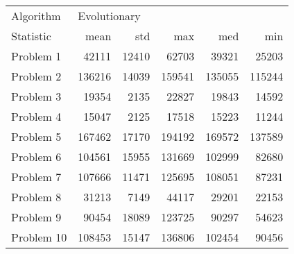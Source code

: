 \begin{tabular}{lrrrrr}
\toprule
Algorithm & \multicolumn{5}{l}{Evolutionary} \\
Statistic &         mean &    std &     max &     med &     min \\
\midrule
Problem 1  &        42111 &  12410 &   62703 &   39321 &   25203 \\
Problem 2  &       136216 &  14039 &  159541 &  135055 &  115244 \\
Problem 3  &        19354 &   2135 &   22827 &   19843 &   14592 \\
Problem 4  &        15047 &   2125 &   17518 &   15223 &   11244 \\
Problem 5  &       167462 &  17170 &  194192 &  169572 &  137589 \\
Problem 6  &       104561 &  15955 &  131669 &  102999 &   82680 \\
Problem 7  &       107666 &  11471 &  125695 &  108051 &   87231 \\
Problem 8  &        31213 &   7149 &   44117 &   29201 &   22153 \\
Problem 9  &        90454 &  18089 &  123725 &   90297 &   54623 \\
Problem 10 &       108453 &  15147 &  136806 &  102454 &   90456 \\
\bottomrule
\end{tabular}

